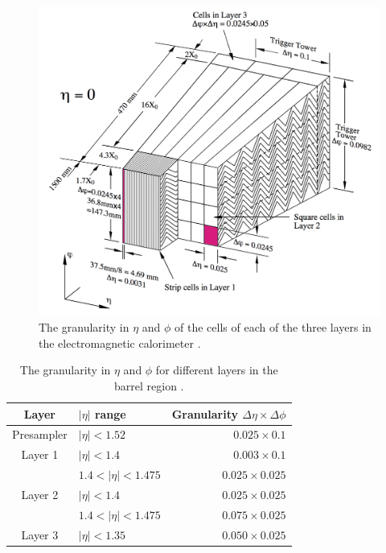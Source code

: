 \begin{figure}
\centering
\includegraphics[width=\textwidth]{data/photo/detector/ECAL.png}
\caption{The granularity in $\eta$ and $\phi$ of the cells of each of the three layers in the electromagnetic calorimeter \cite{ATLAS_doc}.}
\label{fig:ECAL}
\end{figure}

\begin{table}[htpb]
\centering
\begin{tabular}{|c|l|r|}
\hline
Layer & $|\eta|$ range & Granularity $\Delta \eta \times \Delta \phi$ \\
\hline
\hline
Presampler & $|\eta| < 1.52$         & $0.025 \times 0.1$ \\
\hline
Layer 1    & $|\eta| < 1.4$          & $0.003 \times 0.1$ \\
           & $1.4 < |\eta| < 1.475$  & $0.025 \times 0.025$ \\
\hline
Layer 2    & $|\eta| < 1.4$          & $0.025 \times 0.025$ \\
           & $1.4 < |\eta| < 1.475$  & $0.075 \times 0.025$ \\
\hline
Layer 3    & $|\eta| < 1.35$         & $0.050 \times 0.025$ \\
\hline
\end{tabular}
\caption{The granularity in $\eta$ and $\phi$ for different layers in the barrel region \cite{ATLAS_doc}.}
\label{tab:granularity_EM_barrel}
\end{table}

